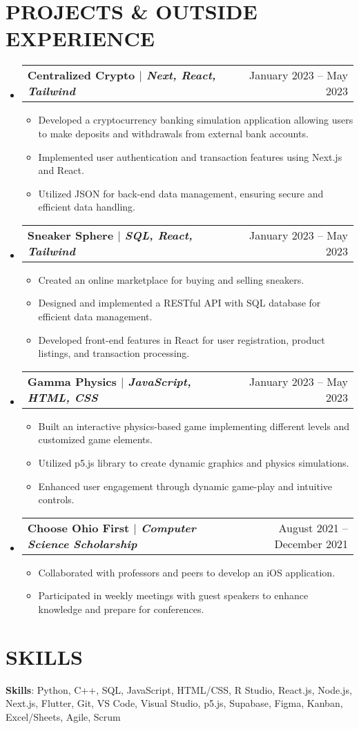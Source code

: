 \documentclass[letterpaper,11pt]{article}
\makeatletter
\newcommand{\projectItem}[1]{
  \item\small{#1}
}
\newcommand{\projectSubHeading}[2]{
  \vspace{-1pt}\item
    \begin{tabular*}{0.97\textwidth}[t]{l@{\extracolsep{\fill}}r}
      \textbf{#1} & #2 \\
    \end{tabular*}\vspace{-5pt}
}
\newcommand{\resumeItemListStart}{\begin{itemize}[leftmargin=*,label=\textbullet]}
\newcommand{\resumeItemListEnd}{\end{itemize}}
\makeatother
\begin{document}
\section{PROJECTS \& OUTSIDE EXPERIENCE}
  \begin{itemize}[leftmargin=0pt,label={}]
    \projectSubHeading
      {\textbf{Centralized Crypto} $|$ \emph{Next, React, Tailwind}}{January 2023 -- May 2023}
      \resumeItemListStart
        \projectItem
          {Developed a cryptocurrency banking simulation application allowing users to make deposits and withdrawals from external bank accounts.}
        \projectItem
          {Implemented user authentication and transaction features using Next.js and React.}
        \projectItem
          {Utilized JSON for back-end data management, ensuring secure and efficient data handling.}
      \resumeItemListEnd
    \projectSubHeading
      {\textbf{Sneaker Sphere} $|$ \emph{SQL, React, Tailwind}}{January 2023 -- May 2023}
      \resumeItemListStart
        \projectItem
          {Created an online marketplace for buying and selling sneakers.}
        \projectItem
          {Designed and implemented a RESTful API with SQL database for efficient data management.}
        \projectItem
          {Developed front-end features in React for user registration, product listings, and transaction processing.}
      \resumeItemListEnd
    \projectSubHeading
      {\textbf{Gamma Physics} $|$ \emph{JavaScript, HTML, CSS}}{January 2023 -- May 2023}
      \resumeItemListStart
        \projectItem
          {Built an interactive physics-based game implementing different levels and customized game elements.}
        \projectItem
          {Utilized p5.js library to create dynamic graphics and physics simulations.}
        \projectItem
          {Enhanced user engagement through dynamic game-play and intuitive controls.}
      \resumeItemListEnd
    \projectSubHeading
      {\textbf{Choose Ohio First $|$ \emph{Computer Science Scholarship}}}{August 2021 -- December 2021}
      \resumeItemListStart
        \projectItem
          {Collaborated with professors and peers to develop an iOS application.}
        \projectItem
          {Participated in weekly meetings with guest speakers to enhance knowledge and prepare for conferences.}
      \resumeItemListEnd
  \end{itemize}

\section{SKILLS}
    \small{\textbf{Skills}{: Python, C++, SQL, JavaScript, HTML/CSS, R Studio, React.js, Node.js, Next.js, Flutter, Git, VS Code, Visual Studio, p5.js, Supabase, Figma, Kanban, Excel/Sheets, Agile, Scrum}}

\end{document}
